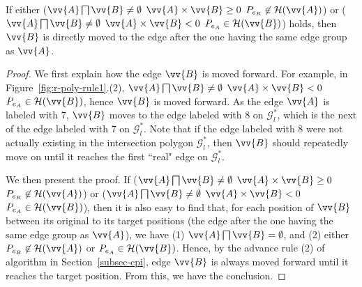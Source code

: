 \begin{prop}
\label{prop-rule2}
If either ($\vv{A} \bigsqcap \vv{B} \ne \emptyset$ \And $\vv{A} \times \vv{B} \ge 0$ \And $P_{e_B} \not \in \mathcal{H}(\vv{A})$) or ($\vv{A} \bigsqcap \vv{B} \ne \emptyset$ \And $\vv{A} \times \vv{B} < 0$ \And $P_{e_A} \in \mathcal{H}(\vv{B})$) holds, then $\vv{B}$ is directly moved to the edge after the one having the same edge group as $\vv{A}$.
\end{prop}

\begin{proof}
We first explain how the edge $\vv{B}$ is moved forward.
For example, in Figure~\ref{fig:r-poly-rule1}.(2), $\vv{A} \bigsqcap \vv{B} \ne \emptyset$ \And $\vv{A} \times \vv{B} < 0$ \And $P_{e_A} \in \mathcal{H}(\vv{B})$, hence $\vv{B}$ is moved forward. As the edge $\vv{A}$ is labeled with 7,
$\vv{B}$ moves to the edge labeled with 8 on $\mathcal{G}^*_{l}$, which is the next of the edge labeled with 7 on $\mathcal{G}^*_{l}$.
Note that if the edge labeled with 8 were not actually existing in the intersection polygon $\mathcal{G}^*_{l}$, then $\vv{B}$ should repeatedly move on until it reaches the first ``real" edge on $\mathcal{G}^*_{l}$.

We then present the proof.
If ($\vv{A} \bigsqcap \vv{B} \ne \emptyset$ \And $\vv{A} \times \vv{B} \ge 0$ \And $P_{e_B} \not \in \mathcal{H}(\vv{A})$) or ($\vv{A} \bigsqcap \vv{B} \ne \emptyset$ \And $\vv{A} \times \vv{B} < 0$ \And $P_{e_A} \in \mathcal{H}(\vv{B})$), then it is also easy to find that, for each position of $\vv{B}$ between its original to its target positions (\ie the edge after the one having the same edge group as $\vv{A}$), we have (1) $\vv{A} \bigsqcap \vv{B} = \emptyset$, and (2) either $P_{e_B} \not \in \mathcal{H}(\vv{A})$ or $P_{e_A} \in \mathcal{H}(\vv{B})$. Hence, by the advance rule (2) of algorithm \cpia in Section~\ref{subsec-cpi}, edge $\vv{B}$ is always moved forward until it reaches the target position. From this, we have the conclusion.
\end{proof}







